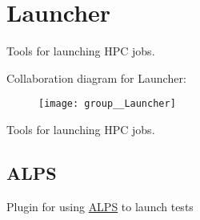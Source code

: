 \hypertarget{group__Launcher}{\section{Launcher}
\label{group__Launcher}
}


Tools for launching H\-P\-C jobs.  


Collaboration diagram for Launcher\-:\nopagebreak
\begin{figure}[H]
\begin{center}
\leavevmode
\texttt{[image: group\_\_Launcher]}
\end{center}
\end{figure}
Tools for launching H\-P\-C jobs. \hypertarget{group__Launcher_ALPS}{}\subsection{A\-L\-P\-S}\label{group__Launcher_ALPS}
Plugin for using \hyperlink{namespaceALPS}{A\-L\-P\-S} to launch tests 
